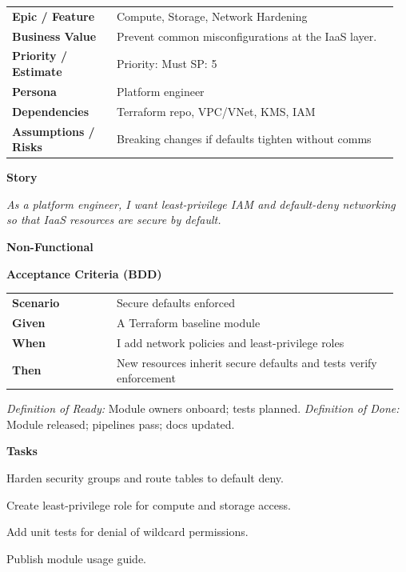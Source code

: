 \documentclass[11pt,letterpaper]{article}
\makeatletter
\newenvironment{kvtable}{%
  \par\noindent\begin{tabular}{@{}>{\raggedright\bfseries\arraybackslash}p{0.26\linewidth} >{\raggedright\arraybackslash}p{0.70\linewidth}@{}}
}{\end{tabular}\par}
\newenvironment{bdd}{%
  \par\noindent\begin{tabular}{@{}>{\raggedright\bfseries\arraybackslash}p{0.26\linewidth} >{\raggedright\arraybackslash}p{0.70\linewidth}@{}}
}{\end{tabular}\par}
\newcommand{\DoRDoD}[2]{%
  \vspace{0.35em}
  {\footnotesize\color{Muted}%
    \textit{Definition of Ready:} #1 \; \textbullet\;
    \textit{Definition of Done:} #2%
  }%
}
\newenvironment{storycard}[2]{%
  \begin{tcolorbox}[cloudcard, title={#1 --- #2}]%
}{\end{tcolorbox}}
\newcommand{\sectionlabel}[1]{\par\vspace{0.35em}\textbf{#1}\par}
\makeatother
\begin{document}
\begin{storycard}{CCS-5}{Ch. 5 — IaaS Focus}
\begin{kvtable}
Epic / Feature & Compute, Storage, Network Hardening\\
Business Value & Prevent common misconfigurations at the IaaS layer.\\
Priority / Estimate & Priority: Must \quad SP: 5\\
Persona & Platform engineer\\
Dependencies & Terraform repo, VPC/VNet, KMS, IAM\\
Assumptions / Risks & Breaking changes if defaults tighten without comms\\
\end{kvtable}
\sectionlabel{Story}
\textit{As a platform engineer, I want least-privilege IAM and default-deny networking so that IaaS resources are secure by default.}
\sectionlabel{Non-Functional}\;
\sectionlabel{Acceptance Criteria (BDD)}
\begin{bdd}
Scenario & Secure defaults enforced\\
Given & A Terraform baseline module\\
When & I add network policies and least-privilege roles\\
Then & New resources inherit secure defaults and tests verify enforcement\\
\end{bdd}
\DoRDoD{Module owners onboard; tests planned.}{Module released; pipelines pass; docs updated.}
\sectionlabel{Tasks}
\begin{checklist}
\item Harden security groups and route tables to default deny.
\item Create least-privilege role for compute and storage access.
\item Add unit tests for denial of wildcard permissions.
\item Publish module usage guide.
\end{checklist}
\end{storycard}
\end{document}

